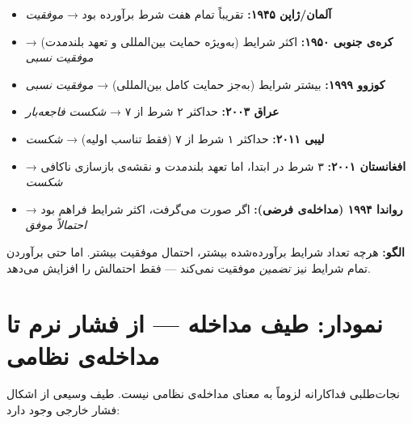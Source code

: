 \begin{tcolorbox}[wavebox, title={آزمون عملی: کدام مداخلات تاریخی هفت شرط را داشتند؟}]
\begin{itemize}
\item \textbf{آلمان/ژاپن ۱۹۴۵:} تقریباً تمام هفت شرط برآورده بود → \textit{موفقیت}
\item \textbf{کره‌ی جنوبی ۱۹۵۰:} اکثر شرایط (به‌ویژه حمایت بین‌المللی و تعهد بلندمدت) → \textit{موفقیت نسبی}
\item \textbf{کوزوو ۱۹۹۹:} بیشتر شرایط (به‌جز حمایت کامل بین‌المللی) → \textit{موفقیت نسبی}
\item \textbf{عراق ۲۰۰۳:} حداکثر ۲ شرط از ۷ → \textit{شکست فاجعه‌بار}
\item \textbf{لیبی ۲۰۱۱:} حداکثر ۱ شرط از ۷ (فقط تناسب اولیه) → \textit{شکست}
\item \textbf{افغانستان ۲۰۰۱:} ۳ شرط در ابتدا، اما تعهد بلندمدت و نقشه‌ی بازسازی ناکافی → \textit{شکست}
\item \textbf{رواندا ۱۹۹۴ (مداخله‌ی فرضی):} اگر صورت می‌گرفت، اکثر شرایط فراهم بود → \textit{احتمالاً موفق}
\end{itemize}

\textbf{الگو:} هرچه تعداد شرایط برآورده‌شده بیشتر، احتمال موفقیت بیشتر. اما حتی برآوردن تمام شرایط نیز \textit{تضمین} موفقیت نمی‌کند — فقط احتمالش را افزایش می‌دهد.
\end{tcolorbox}


\section{نمودار: طیف مداخله — از فشار نرم تا مداخله‌ی نظامی}
\label{sec:ch15-intervention-spectrum}

نجات‌طلبی فداکارانه لزوماً به معنای مداخله‌ی نظامی نیست. طیف وسیعی از اشکال فشار خارجی وجود دارد:


